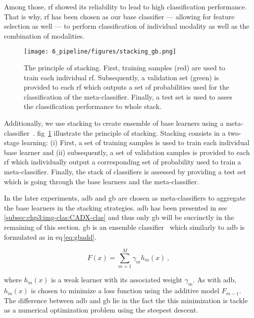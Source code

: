 Among those, \ac{rf} showed its reliability to lead to high classification performance.
That is why, \ac{rf} has been chosen as our base classifier --- allowing for feature selection as well --- to perform classification of individual modality as well as the combination of modalities.

\begin{figure}
  \centering
  \texttt{[image: 6\_pipeline/figures/stacking\_gb.png]}
  \caption[The principle of stacking.]{The principle of stacking. First, training samples (red) are used to train each individual \ac{rf}. Subsequently, a validation set (green) is provided to each \ac{rf} which outputs a set of probabilities used for the classification of the meta-classifier. Finally, a test set is used to asses the classification performance to whole stack.}
  \label{fig:stacking}
\end{figure}

Additionally, we use stacking to create ensemble of base learners using a meta-classifier~\cite{wolpert1992stacked}.
\Acl{fig}~\ref{fig:stacking} illustrate the principle of stacking.
Stacking consists in a two-stage learning:
(i) First, a set of training samples is used to train each individual base learner and
(ii) subsequently, a set of validation samples is provided to each \ac{rf} which individually output a corresponding set of probability used to train a meta-classifier.
Finally, the stack of classifiers is assessed by providing a test set which is going through the base learners and the meta-classifier.

In the later experiments, \ac{adb} and \ac{gb} are chosen as meta-classifiers to aggregate the base learners in the stacking strategies.
\ac{adb} has been presented in \acs{sec}\,\ref{subsec:chp3:img-clas:CADX-clas} and thus only \ac{gb} will be succinctly in the remaining of this section.
\ac{gb} is an ensemble classifier~\cite{friedman2001greedy} which similarly to \ac{adb} is formulated as in \acs{eq}\,\eqref{eq:gbadd}.

\begin{equation}
  F(x) = \sum_{m=1}^{M} \gamma_{m} h_m(x) \ ,
  \label{eq:gbadd}
\end{equation}

\noindent where $h_m(x)$ is a weak learner with its associated weight $\gamma_m$.
As with \ac{adb}, $h_m(x)$ is chosen to minimize a loss function using the additive model $F_{m-1}$.
The difference between \ac{adb} and \ac{gb} lie in the fact the this minimization is tackle as a numerical optimization problem using the steepest descent.
